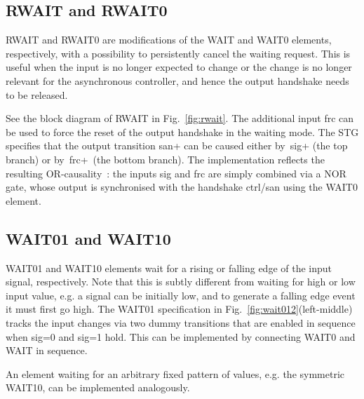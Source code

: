 \documentclass[conference]{IEEEtran}
\begin{document}
\subsection*{\textsf{RWAIT} and \textsf{RWAIT0}}

\textsf{RWAIT} and \textsf{RWAIT0} are modifications of the \textsf{WAIT} and \textsf{WAIT0}
elements, respectively, with a possibility to persistently cancel the waiting request. This
is useful when the input is no longer expected to change or the change is no longer relevant
for the asynchronous controller, and hence the output handshake needs to be released.

See the block diagram of \textsf{RWAIT} in Fig.~\ref{fig:rwait}. The additional input
\textsf{frc} can be used to force the reset of the output handshake in the waiting mode. The
STG specifies that the output transition \textsf{san+} can be caused either by~\textsf{sig+}
(the top branch) or by~\textsf{frc+}~(the bottom branch). The implementation reflects the resulting
OR-causality~\cite{1996_yakovlev_or}: the inputs \textsf{sig} and \textsf{frc} are simply
combined via a NOR gate, whose output is synchronised with the handshake \textsf{ctrl/san}
using the \textsf{WAIT0} element.


\subsection*{\textsf{WAIT01} and \textsf{WAIT10}}

\textsf{WAIT01} and \textsf{WAIT10} elements wait for a rising or falling edge of the input
signal, respectively. Note that this is subtly different from waiting for high or low input value,
e.g. a signal can be initially low, and to generate a falling edge event it must first go high.
The \textsf{WAIT01} specification in Fig.~\ref{fig:wait012}(left-middle) tracks the input changes
via two dummy transitions that are enabled in sequence when \textsf{sig=0} and \textsf{sig=1} hold.
This can be implemented by connecting \textsf{WAIT0} and \textsf{WAIT} in sequence.

An element waiting for an arbitrary fixed pattern of values, e.g. the symmetric
\textsf{WAIT10}, can be implemented analogously.
\end{document}
